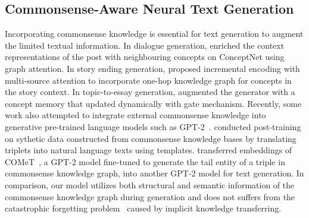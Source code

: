 \documentclass[11pt,a4paper]{article}
\begin{document}
\subsection{Commonsense-Aware Neural Text Generation}
Incorporating commonsense knowledge is essential for text generation to 
augment the limited textual information. In dialogue generation, \citet{Zhou2018CommonsenseKA} enriched the context representations of the post with neighbouring concepts on ConceptNet using graph attention. In story ending generation, \citet{Guan2019StoryEG} proposed incremental encoding with multi-source attention to incorporate one-hop knowledge graph for concepts in the story context.
In topic-to-essay generation, \citet{yang-etal-2019-enhancing-topic} augmented the generator with a concept memory that updated dynamically with gate mechanism.
Recently, some work also attempted to integrate external commonsense knowledge into generative pre-trained language models such as GPT-2~\citep{Radford2019LanguageMA}. \citet{guan2020knowledge} conducted post-training on sythetic data constructed from commonsense knowledge bases by translating triplets into natural language texts using templates. \citet{Bhagavatula2019AbductiveCR} transferred embeddings of COMeT~\citep{Bosselut2019COMETCT}, a GPT-2 model fine-tuned to 
generate the tail entity of a triple in commonsense knowledge graph, into another GPT-2 model for text generation. In comparison, our model utilizes both structural and semantic information of the commonsense knowledge graph during generation and does not suffers from the catastrophic forgetting problem~\citep{Kirkpatrick2016OvercomingCF} caused by implicit knowledge transferring.
\end{document}
